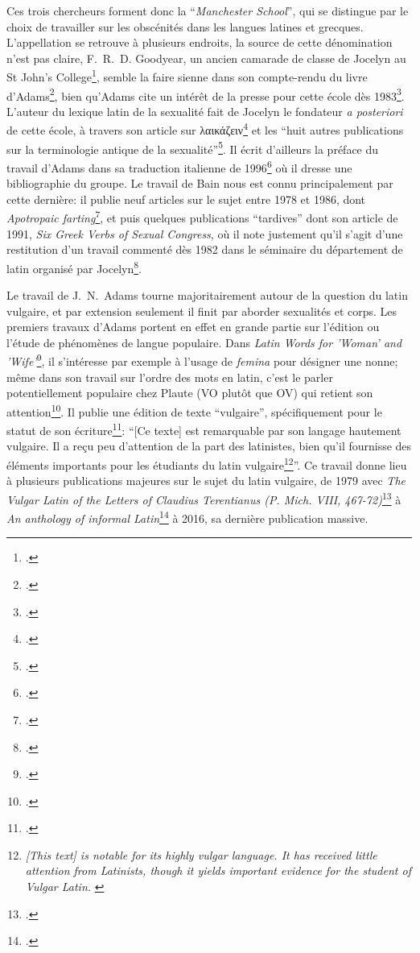 Ces trois chercheurs forment donc la \enquote{\textit{Manchester School}}, qui se distingue par le choix de travailler sur les obscénités dans les langues latines et grecques. L'appellation se retrouve à plusieurs endroits, la source de cette dénomination n'est pas claire, F.~R.~D. Goodyear, un ancien camarade de classe de Jocelyn au St John's College\footcite[p.~282]{adams_henry_2003}, semble la faire sienne dans son compte-rendu du livre d'Adams\footcite{goodyear_praefanda_1985}, bien qu'Adams cite un intérêt de la presse pour cette école dès 1983\footcite[p.~289]{adams_henry_2003}. L'auteur du lexique latin de la sexualité fait de Jocelyn le fondateur \textit{a posteriori} de cette école, à travers son article sur λαικάζειν\footcite{jocelyn_greek_1980} et les \enquote{huit autres publications sur la terminologie antique de la sexualité}\footcite[p.~290]{adams_henry_2003}. Il écrit d'ailleurs la préface du travail d'Adams dans sa traduction italienne de 1996\footcite{adams1996vocabolario} où il dresse une bibliographie du groupe. Le travail de Bain nous est connu principalement par cette dernière: il publie neuf articles sur le sujet entre 1978 et 1986, dont \textit{Apotropaic farting}\footcite{bain1986apotropaic}, et puis quelques publications \enquote{tardives} dont son article de 1991, \textit{Six Greek Verbs of Sexual Congress}, où il note justement qu'il s'agit d'une restitution d'un travail commenté dès 1982 dans le séminaire du département de latin organisé par Jocelyn\footcite{bain_six_1991}. 

Le travail de J.~N.~Adams tourne majoritairement autour de la question du latin vulgaire, et par extension seulement il finit par aborder sexualités et corps. Les premiers travaux d'Adams portent en effet en grande partie sur l'édition ou l'étude de phénomènes de langue populaire. Dans \textit{Latin Words for 'Woman' and 'Wife'}\footcite{adams1972latin}, il s'intéresse par exemple à l'usage de \textit{femina} pour désigner une nonne; même dans son travail sur l'ordre des mots en latin, c'est le parler potentiellement populaire chez Plaute (VO plutôt que OV) qui retient son attention\footcite[p.~95]{adams_typological_1976}. Il publie une édition de texte \enquote{vulgaire}, spécifiquement pour le statut de son écriture\footcite{adams_text_1976}: \enquote{[Ce texte] est remarquable par son langage hautement vulgaire. Il a reçu peu d'attention de la part des latinistes, bien qu'il fournisse des éléments importants pour les étudiants du latin vulgaire\footnote{\textit{[This text] is notable for its highly vulgar language. It has received little attention from Latinists, though it yields important evidence for the student of Vulgar Latin.} \textcite[p.~2]{adams_text_1976}}}. Ce travail donne lieu à plusieurs publications majeures sur le sujet du latin vulgaire, de 1979 avec \textit{The Vulgar Latin of the Letters of Claudius Terentianus (P. Mich. VIII, 467-72)}\footcite{adams_vulgar_1977} à \textit{An anthology of informal Latin}\footcite{adams2016anthology} à 2016, sa dernière publication massive.

